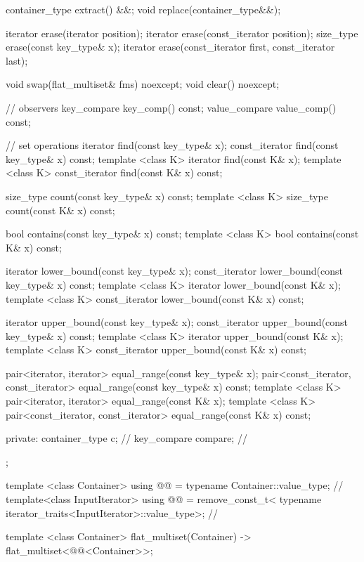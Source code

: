 \begin{codeblock}
\begin{codeblock}
\begin{codeblock}
\begin{addedblock}
\begin{codeblock}
{    container_type extract() &&;
    void replace(container_type&&);

    iterator erase(iterator position);
    iterator erase(const_iterator position);
    size_type erase(const key_type& x);
    iterator erase(const_iterator first, const_iterator last);

    void swap(flat_multiset& fms) noexcept;
    void clear() noexcept;

    // observers
    key_compare key_comp() const;
    value_compare value_comp() const;

    // set operations
    iterator find(const key_type& x);
    const_iterator find(const key_type& x) const;
    template <class K> iterator find(const K& x);
    template <class K> const_iterator find(const K& x) const;

    size_type count(const key_type& x) const;
    template <class K> size_type count(const K& x) const;

    bool contains(const key_type& x) const;
    template <class K> bool contains(const K& x) const;

    iterator lower_bound(const key_type& x);
    const_iterator lower_bound(const key_type& x) const;
    template <class K> iterator lower_bound(const K& x);
    template <class K> const_iterator lower_bound(const K& x) const;

    iterator upper_bound(const key_type& x);
    const_iterator upper_bound(const key_type& x) const;
    template <class K> iterator upper_bound(const K& x);
    template <class K> const_iterator upper_bound(const K& x) const;

    pair<iterator, iterator> equal_range(const key_type& x);
    pair<const_iterator, const_iterator> equal_range(const key_type& x) const;
    template <class K>
      pair<iterator, iterator> equal_range(const K& x);
    template <class K>
      pair<const_iterator, const_iterator> equal_range(const K& x) const;

  private:
      container_type c;    // \expos
      key_compare compare; // \expos
  };

  template <class Container>
    using @@ = typename Container::value_type; // \expos
  template<class InputIterator>
    using @@ = remove_const_t<
      typename iterator_traits<InputIterator>::value_type>;     // \expos

  template <class Container>
    flat_multiset(Container)
      -> flat_multiset<@@<Container>>;


\end{codeblock}
\end{addedblock}
\end{codeblock}
\end{codeblock}
\end{codeblock}

